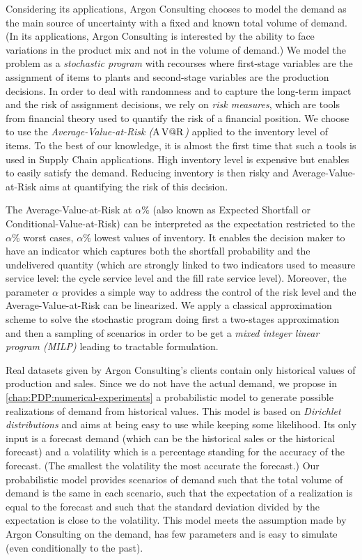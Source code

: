 Considering its applications, Argon Consulting chooses to model the demand as the main source of uncertainty with a fixed and known total volume of demand.
(In its applications, Argon Consulting is interested by the ability to face variations in the product mix and not in the volume of demand.)
We model the problem as a \emph{stochastic program} with recourses where first-stage variables are the assignment of items to plants and second-stage variables are the production decisions.
In order to deal with randomness and to capture the long-term impact and the risk of assignment decisions, we rely on \emph{risk measures}, which are tools from financial theory used to quantify the risk of a financial position.
We choose to use the \emph{Average-Value-at-Risk ($\operatorname{A\operatorname{V@R}}$)} applied to the inventory level of items.
To the best of our knowledge, it is almost the first time that such a tools is used in Supply Chain applications.
High inventory level is expensive but enables to easily satisfy the demand.
Reducing inventory is then risky and Average-Value-at-Risk aims at quantifying the risk of this decision.


The Average-Value-at-Risk at $\alpha\%$ (also known as Expected Shortfall or Conditional-Value-at-Risk) can be interpreted as the expectation restricted to the $\alpha\%$ worst cases, \ie $\alpha\%$ lowest values of inventory.
It enables the decision maker to have an indicator which captures both the shortfall probability and the undelivered quantity (which are strongly linked to two indicators used to measure service level: the cycle service level and the fill rate service level).
Moreover, the parameter $\alpha$ provides a simple way to address the control of the risk level and the Average-Value-at-Risk can be linearized.
We apply a classical approximation scheme to solve the stochastic program doing first a two-stages approximation and then a sampling of scenarios in order to be get a \emph{mixed integer linear program (MILP)} leading to tractable formulation.


\medskip


Real datasets given by Argon Consulting's clients contain only historical values of production and sales.
Since we do not have the actual demand, we propose in \cref{chap:PDP:numerical-experiments} a probabilistic model to generate possible realizations of demand from historical values.
This model is based on \emph{Dirichlet distributions} and aims at being easy to use while keeping some likelihood.
Its only input is a forecast demand (which can be the historical sales or the historical forecast) and a volatility which is a percentage standing for the accuracy of the forecast.
(The smallest the volatility the most accurate the forecast.)
Our probabilistic model provides scenarios of demand such that the total volume of demand is the same in each scenario, such that the expectation of a realization is equal to the forecast and such that the standard deviation divided by the expectation is close to the volatility.
This model meets the assumption made by Argon Consulting on the demand, has few parameters and is easy to simulate (even conditionally to the past).


